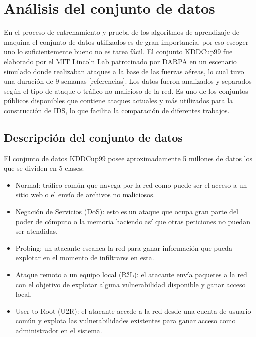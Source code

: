 \chapter{Análisis del conjunto de datos}\label{chapter:dataset}

En el proceso de entrenamiento y prueba de los algoritmos de aprendizaje de maquina el conjunto de datos utilizados es de gran importancia, por eso escoger uno lo suficientemente bueno no es tarea fácil. El conjunto KDDCup99 fue elaborado por el MIT Lincoln Lab patrocinado por DARPA en un escenario simulado donde realizaban ataques a la base de las fuerzas aéreas, lo cual tuvo una duración de 9 semanas [referencias]. Los datos fueron analizados y separados según el tipo de ataque o tráfico no malicioso de la red. Es uno de los conjuntos públicos disponibles que contiene ataques actuales y más utilizados para la construcción de IDS, lo que facilita la comparación de diferentes trabajos.

\section{Descripción del conjunto de datos}
El conjunto de datos KDDCup99 posee aproximadamente 5 millones de datos los que se dividen en 5 clases:

\begin{itemize}
    \item Normal: tráfico común que navega por la red como puede ser el acceso a un sitio web o el envío de archivos no maliciosos.
    \item Negación de Servicios (DoS): esto es un ataque que ocupa gran parte del poder de cómputo o la memoria haciendo así que otras peticiones no puedan ser atendidas.
    \item Probing: un atacante escanea la red para ganar información que pueda explotar en el momento de infiltrarse en esta.
    \item Ataque remoto a un equipo local (R2L): el atacante envía paquetes a la red con el objetivo de explotar alguna vulnerabilidad disponible y ganar acceso local.
    \item User to Root (U2R): el atacante accede a la red desde una cuenta de usuario común y explota las vulnerabilidades existentes para ganar acceso como administrador en el sistema.
\end{itemize}

